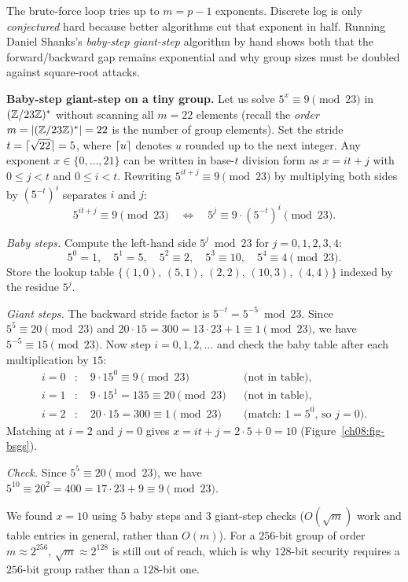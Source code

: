 The brute-force loop tries up to $m = p - 1$ exponents. Discrete log is only \emph{conjectured} hard because better algorithms cut that exponent in half. Running Daniel Shanks's \emph{baby-step giant-step} algorithm by hand shows both that the forward/backward gap remains exponential and why group sizes must be doubled against square-root attacks.

\begin{labbox}
\textbf{Baby-step giant-step on a tiny group.} Let us solve $5^{x}\equiv 9 \pmod{23}$ in $(\mathbb{Z}/23\mathbb{Z})^{*}$ without scanning all $m = 22$ elements (recall the \emph{order} $m = |(\mathbb{Z}/23\mathbb{Z})^{*}| = 22$ is the number of group elements). Set the stride $t = \lceil\sqrt{22}\rceil = 5$, where $\lceil u\rceil$ denotes $u$ rounded up to the next integer. Any exponent $x \in \{0,\dots,21\}$ can be written in base-$t$ division form as $x = it + j$ with $0 \le j < t$ and $0 \le i < t$. Rewriting $5^{it+j} \equiv 9 \pmod{23}$ by multiplying both sides by $(5^{-t})^{i}$ separates $i$ and $j$:
\[
5^{it + j} \equiv 9 \pmod{23} \quad\Longleftrightarrow\quad 5^{j} \equiv 9\cdot (5^{-t})^{i} \pmod{23}.
\]

\emph{Baby steps.} Compute the left-hand side $5^{j}\bmod 23$ for $j = 0,1,2,3,4$:
\[
5^{0} = 1,\quad 5^{1} = 5,\quad 5^{2} \equiv 2,\quad 5^{3} \equiv 10,\quad 5^{4} \equiv 4 \pmod{23}.
\]
Store the lookup table $\{(1,0),\,(5,1),\,(2,2),\,(10,3),\,(4,4)\}$ indexed by the residue $5^j$.

\medskip
\emph{Giant steps.} The backward stride factor is $5^{-t} = 5^{-5}\bmod 23$. Since $5^{5}\equiv 20 \pmod{23}$ and $20\cdot 15 = 300 = 13\cdot 23 + 1 \equiv 1 \pmod{23}$, we have $5^{-5} \equiv 15 \pmod{23}$. Now step $i = 0, 1, 2, \dots$ and check the baby table after each multiplication by $15$:
\begin{align*}
  i = 0 &: \quad 9\cdot 15^{0} \equiv 9 \pmod{23} && \text{(not in table)}, \\
  i = 1 &: \quad 9\cdot 15^{1} = 135 \equiv 20 \pmod{23} && \text{(not in table)}, \\
  i = 2 &: \quad 20\cdot 15 = 300 \equiv 1 \pmod{23} && \text{(match: } 1 = 5^{0}\text{, so } j = 0\text{)}.
\end{align*}
Matching at $i = 2$ and $j = 0$ gives $x = it + j = 2\cdot 5 + 0 = 10$ (Figure~\ref{ch08:fig-bsgs}).

\medskip
\emph{Check.} Since $5^{5}\equiv 20 \pmod{23}$, we have $5^{10}\equiv 20^{2} = 400 = 17\cdot 23 + 9 \equiv 9 \pmod{23}$.

\medskip
We found $x = 10$ using $5$ baby steps and $3$ giant-step checks ($O(\sqrt{m})$ work and table entries in general, rather than $O(m)$). For a $256$-bit group of order $m \approx 2^{256}$, $\sqrt{m} \approx 2^{128}$ is still out of reach, which is why $128$-bit security requires a $256$-bit group rather than a $128$-bit one.
\end{labbox}


